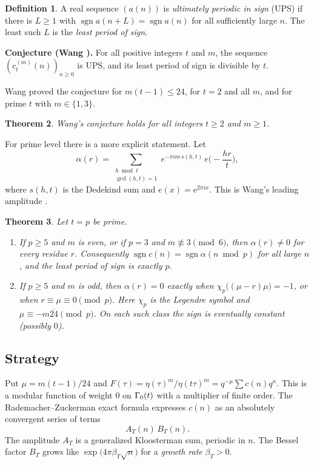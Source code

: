 \documentclass[11pt]{amsart}
\newtheorem{theorem}{Theorem}[section]\newtheorem{lemma}[theorem]{Lemma}\newtheorem{proposition}[theorem]{Proposition}\newtheorem{corollary}[theorem]{Corollary}
\theoremstyle{definition}\newtheorem{definition}[theorem]{Definition}
\theoremstyle{remark}\newtheorem{remark}[theorem]{Remark}
\newcommand{\e}{\mathrm e}\newcommand{\Z}{\mathbb Z}\newcommand{\Q}{\mathbb Q}\newcommand{\C}{\mathbb C}
\newcommand{\sgn}{\operatorname{sgn}}\newcommand{\lcm}{\operatorname{lcm}}
\begin{document}
\begin{definition}
A real sequence $(a(n))$ is \emph{ultimately periodic in sign} (UPS) if there is $L\ge1$ with $\sgn a(n+L)=\sgn a(n)$ for all sufficiently large $n$. The least such $L$ is the \emph{least period of sign}.
\end{definition}

\noindent\textbf{Conjecture (Wang \cite[Conj.~1.6]{W}).} For all positive integers $t$ and $m$, the sequence $(c_t^{(m)}(n))_{n\ge0}$ is UPS, and its least period of sign is divisible by $t$.

Wang proved the conjecture for $m(t-1)\le24$, for $t=2$ and all $m$, and for prime $t$ with $m\in\{1,3\}$.

\begin{theorem}\label{thm:main}
Wang's conjecture holds for all integers $t\ge2$ and $m\ge1$.
\end{theorem}

For prime level there is a more explicit statement. Let
\[
\alpha(r)=\sum_{\substack{h\bmod t\\ \gcd(h,t)=1}}e^{-\pi i m\,s(h,t)}\,e\Big(-\frac{hr}t\Big),
\]
where $s(h,t)$ is the Dedekind sum and $e(x)=\e^{2\pi ix}$. This is Wang's leading amplitude \cite[(1.21)]{W}.

\begin{theorem}\label{thm:prime}
Let $t=p$ be prime.
\begin{enumerate}[label=(\alph*),leftmargin=2em]
\item If $p\ge5$ and $m$ is even, or if $p=3$ and $m\not\equiv3\pmod6$, then $\alpha(r)\ne0$ for every residue $r$. Consequently $\sgn c(n)=\sgn\alpha(n\bmod p)$ for all large $n$, and the least period of sign is exactly $p$.
\item If $p\ge5$ and $m$ is odd, then $\alpha(r)=0$ exactly when $\chi_p\big((\mu-r)\mu\big)=-1$, or when $r\equiv\mu\equiv0\pmod p$. Here $\chi_p$ is the Legendre symbol and $\mu\equiv-m\overline{24}\pmod p$. On each such class the sign is eventually constant (possibly $0$).
\end{enumerate}
\end{theorem}

\subsection{Strategy}
Put $\mu=m(t-1)/24$ and $F(\tau)=\eta(\tau)^m/\eta(t\tau)^m=q^{-\mu}\sum c(n)q^n$. This is a modular function of weight $0$ on $\Gamma_0(t)$ with a multiplier of finite order. The Rademacher--Zuckerman exact formula expresses $c(n)$ as an absolutely convergent series of terms
\[
A_T(n)\,B_T(n).
\]
The amplitude $A_T$ is a generalized Kloosterman sum, periodic in $n$. The Bessel factor $B_T$ grows like $\exp\big(4\pi\beta_T\sqrt n\big)$ for a \emph{growth rate} $\beta_T>0$.
\end{document}
